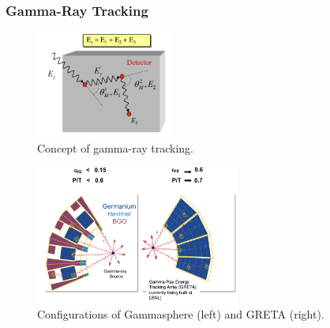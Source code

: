 \subsubsection{Gamma-Ray Tracking}
\begin{figure}[ht]
    \centering
    \includegraphics[width=0.4\textwidth]{images/gamma_ray_tracking.png}
    \caption{Concept of gamma-ray tracking.}
    \label{fig:gamma_ray_tracking}
\end{figure}
\begin{figure}[ht]
        \centering
        \includegraphics[width=0.6\textwidth]{images/gammasphere_GRETA.png}
        \caption{Configurations of Gammasphere (left) and GRETA (right).}
        \label{fig:gammasphere_GRETA}
    \end{figure}
